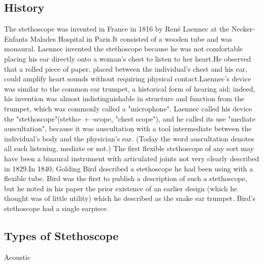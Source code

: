 \documentclass[12pt]{article}
\begin{document}
\subsection{History}
The stethoscope was invented in France in 1816 by René Laennec at the Necker-Enfants Malades Hospital in Paris.It consisted of a wooden tube and was monaural. Laennec invented the stethoscope because he was not comfortable placing his ear directly onto a woman's chest to listen to her heart.He observed that a rolled piece of paper, placed between the individual's chest and his ear, could amplify heart sounds without requiring physical contact.Laennec's device was similar to the common ear trumpet, a historical form of hearing aid; indeed, his invention was almost indistinguishable in structure and function from the trumpet, which was commonly called a "microphone". Laennec called his device the "stethoscope"(stetho- + -scope, "chest scope"), and he called its use "mediate auscultation", because it was auscultation with a tool intermediate between the individual's body and the physician's ear. (Today the word auscultation denotes all such listening, mediate or not.) The first flexible stethoscope of any sort may have been a binaural instrument with articulated joints not very clearly described in 1829.In 1840, Golding Bird described a stethoscope he had been using with a flexible tube. Bird was the first to publish a description of such a stethoscope, but he noted in his paper the prior existence of an earlier design (which he thought was of little utility) which he described as the snake ear trumpet. Bird's stethoscope had a single earpiece.
\subsection{Types of Stethoscope}
Acoustic
\end{document}
